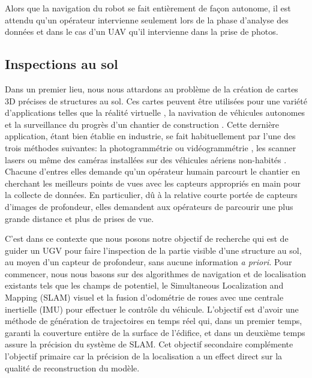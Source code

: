 Alors que la navigation du robot se fait entièrement de façon autonome, il est attendu qu'un opérateur intervienne seulement lors de la phase d'analyse des données et dans le cas d'un UAV qu'il intervienne dans la prise de photos.

\subsection{Inspections au sol}
Dans un premier lieu, nous nous attardons au problème de la création de cartes 3D précises de structures au sol. Ces cartes peuvent être utilisées pour une variété d'applications telles que la réalité virtuelle \citep{googlevr2017}, la navivation de véhicules autonomes \citep{deepmap2017} et la surveillance du progrès d'un chantier de construction \citep{Omar2018}. Cette dernière application, étant bien établie en industrie, se fait habituellement par l'une des trois méthodes suivantes: la photogrammétrie ou vidéogrammétrie \citep{BRILAKIS2011884}, les scanner lasers \citep{Turkan2012} ou même des caméras installées sur des véhicules aériens non-habités \citep{lin2015framework}. Chacune d'entres elles demande qu'un opérateur humain parcourt le chantier en cherchant les meilleurs points de vues avec les capteurs appropriés en main pour la collecte de données. En particulier, dû à la relative courte portée de capteurs d'images de profondeur, elles demandent aux opérateurs de parcourir une plus grande distance et plus de prises de vue.

C'est dans ce contexte que nous posons notre objectif de recherche qui est de guider un UGV pour faire l'inspection de la partie visible d'une structure au sol, au moyen d'un capteur de profondeur, sans aucune information \textit{a priori}. Pour commencer, nous nous basons sur des algorithmes de navigation et de localisation existants tels que les champs de potentiel, le Simultaneous Localization and Mapping (SLAM) visuel et la fusion d'odométrie de roues avec une centrale inertielle (IMU) pour effectuer le contrôle du véhicule. L'objectif est d'avoir une méthode de génération de trajectoires en temps réel qui, dans un premier temps, garanti la couverture entière de la surface de l'édifice, et dans un deuxième temps assure la précision du système de SLAM. Cet objectif secondaire complémente l'objectif primaire car la précision de la localisation a un effect direct sur la qualité de reconstruction du modèle.

